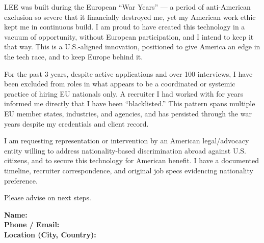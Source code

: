 \documentclass[12pt]{article}
\begin{document}
LEE was built during the European ``War Years'' — a period of anti-American exclusion so severe that it financially destroyed me, yet my American work ethic kept me in continuous build. I am proud to have created this technology in a vacuum of opportunity, without European participation, and I intend to keep it that way. This is a U.S.-aligned innovation, positioned to give America an edge in the tech race, and to keep Europe behind it.

For the past 3 years, despite active applications and over 100 interviews, I have been excluded from roles in what appears to be a coordinated or systemic practice of hiring EU nationals only. A recruiter I had worked with for years informed me directly that I have been ``blacklisted.'' This pattern spans multiple EU member states, industries, and agencies, and has persisted through the war years despite my credentials and client record.

I am requesting representation or intervention by an American legal/advocacy entity willing to address nationality-based discrimination abroad against U.S. citizens, and to secure this technology for American benefit. I have a documented timeline, recruiter correspondence, and original job specs evidencing nationality preference.

Please advise on next steps.

\textbf{Name:} \\
\textbf{Phone / Email:} \\
\textbf{Location (City, Country):}
\end{document}

